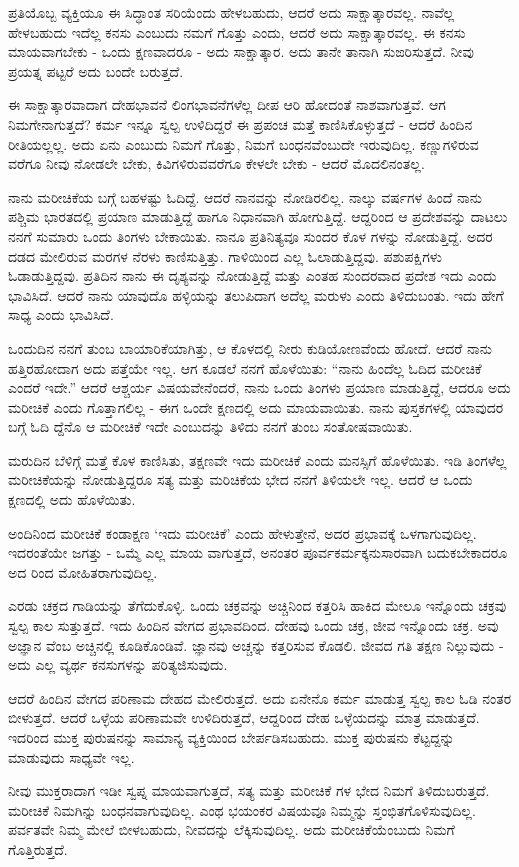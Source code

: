 ಪ್ರತಿಯೊಬ್ಬ ವ್ಯಕ್ತಿಯೂ ಈ ಸಿದ್ಧಾಂತ ಸರಿಯೆಂದು ಹೇಳಬಹುದು, ಆದರೆ ಅದು ಸಾಕ್ಷಾತ್ಕಾರವಲ್ಲ. ನಾವೆಲ್ಲ ಹೇಳಬಹುದು ಇದೆಲ್ಲ ಕನಸು ಎಂಬುದು ನಮಗೆ ಗೊತ್ತು ಎಂದು, ಆದರೆ ಅದು ಸಾಕ್ಷಾತ್ಕಾರವಲ್ಲ. ಈ ಕನಸು ಮಾಯವಾಗಬೇಕು - ಒಂದು ಕ್ಷಣವಾದರೂ - ಅದು ಸಾಕ್ಷಾತ್ಕಾರ. ಅದು ತಾನೇ ತಾನಾಗಿ ಸುಙರಿಸುತ್ತದೆ. ನೀವು ಪ್ರಯತ್ನ ಪಟ್ಟರೆ ಅದು ಬಂದೇ ಬರುತ್ತದೆ.

ಈ ಸಾಕ್ಷಾತ್ಕಾರವಾದಾಗ ದೇಹಭಾವನೆ ಲಿಂಗಭಾವನೆಗಳೆಲ್ಲ ದೀಪ ಆರಿ ಹೋದಂತೆ ನಾಶವಾಗುತ್ತವೆ. ಆಗ ನಿಮಗೇನಾಗುತ್ತದೆ? ಕರ್ಮ ಇನ್ನೂ ಸ್ವಲ್ಪ ಉಳಿದಿದ್ದರೆ ಈ ಪ್ರಪಂಚ ಮತ್ತೆ ಕಾಣಿಸಿಕೊಳ್ಳುತ್ತದೆ - ಆದರೆ ಹಿಂದಿನ ರೀತಿಯಲ್ಲಲ್ಲ. ಅದು ಏನು ಎಂಬುದು ನಿಮಗೆ ಗೊತ್ತು, ನಿಮಗೆ ಬಂಧನವೆಂಬುದೇ ಇರುವುದಿಲ್ಲ. ಕಣ್ಣುಗಳಿರುವ ವರೆಗೂ ನೀವು ನೋಡಲೇ ಬೇಕು, ಕಿವಿಗಳಿರುವವರೆಗೂ ಕೇಳಲೇ ಬೇಕು - ಆದರೆ ಮೊದಲಿನಂತಲ್ಲ.

ನಾನು ಮರೀಚಿಕೆಯ ಬಗ್ಗೆ ಬಹಳಷ್ಟು ಓದಿದ್ದೆ. ಆದರೆ ನಾನವನ್ನು ನೋಡಿರಲಿಲ್ಲ. ನಾಲ್ಕು ವರ್ಷಗಳ ಹಿಂದೆ ನಾನು ಪಶ್ಚಿಮ ಭಾರತದಲ್ಲಿ ಪ್ರಯಾಣ ಮಾಡುತ್ತಿದ್ದೆ ಹಾಗೂ ನಿಧಾನವಾಗಿ ಹೋಗುತ್ತಿದ್ದೆ. ಆದ್ದರಿಂದ ಆ ಪ್ರದೇಶವನ್ನು ದಾಟಲು ನನಗೆ ಸುಮಾರು ಒಂದು ತಿಂಗಳು ಬೇಕಾಯಿತು. ನಾನೂ ಪ್ರತಿನಿತ್ಯವೂ ಸುಂದರ ಕೊಳ ಗಳನ್ನು ನೋಡುತ್ತಿದ್ದೆ. ಅದರ ದಡದ ಮೇಲಿರುವ ಮರಗಳ ನೆರಳು ಕಾಣಿಸುತ್ತಿತ್ತು. ಗಾಳಿಯಿಂದ ಎಲ್ಲ ಓಲಾಡುತ್ತಿದ್ದವು. ಪಶುಪಕ್ಷಿಗಳು ಓಡಾಡುತ್ತಿದ್ದವು. ಪ್ರತಿದಿನ ನಾನು ಈ ದೃಶ್ಯವನ್ನು ನೋಡುತ್ತಿದ್ದೆ ಮತ್ತು ಎಂತಹ ಸುಂದರವಾದ ಪ್ರದೇಶ ಇದು ಎಂದು ಭಾವಿಸಿದೆ. ಆದರೆ ನಾನು ಯಾವುದೊ ಹಳ್ಳಿಯನ್ನು ತಲುಪಿದಾಗ ಅದೆಲ್ಲ ಮರುಳು ಎಂದು ತಿಳಿದುಬಂತು. ಇದು ಹೇಗೆ ಸಾಧ್ಯ ಎಂದು ಭಾವಿಸಿದೆ.

ಒಂದುದಿನ ನನಗೆ ತುಂಬ ಬಾಯಾರಿಕೆಯಾಗಿತ್ತು, ಆ ಕೊಳದಲ್ಲಿ ನೀರು ಕುಡಿಯೋಣವೆಂದು ಹೋದೆ. ಆದರೆ ನಾನು ಹತ್ತಿರಹೋದಾಗ ಅದು ಪತ್ತೆಯೇ ಇಲ್ಲ. ಆಗ ಕೂಡಲೆ ನನಗೆ ಹೊಳೆಯಿತು: “ನಾನು ಹಿಂದೆಲ್ಲ ಓದಿದ ಮರೀಚಿಕೆ ಎಂದರೆ ಇದೇ.” ಆದರೆ ಆಶ್ಚರ್ಯ ವಿಷಯವೇನೆಂದರೆ, ನಾನು ಒಂದು ತಿಂಗಳು ಪ್ರಯಾಣ ಮಾಡುತ್ತಿದ್ದೆ, ಆದರೂ ಅದು ಮರೀಚಿಕೆ ಎಂದು ಗೊತ್ತಾಗಲಿಲ್ಲ - ಈಗ ಒಂದೇ ಕ್ಷಣದಲ್ಲಿ ಅದು ಮಾಯವಾಯಿತು. ನಾನು ಪುಸ್ತಕಗಳಲ್ಲಿ ಯಾವುದರ ಬಗ್ಗೆ ಓದಿ ದ್ದೆನೊ ಆ ಮರೀಚಿಕೆ ಇದೇ ಎಂಬುದನ್ನು ತಿಳಿದು ನನಗೆ ತುಂಬ ಸಂತೋಷವಾಯಿತು.

ಮರುದಿನ ಬೆಳಿಗ್ಗೆ ಮತ್ತೆ ಕೊಳ ಕಾಣಿಸಿತು, ತಕ್ಷಣವೇ ಇದು ಮರೀಚಿಕೆ ಎಂದು ಮನಸ್ಸಿಗೆ ಹೊಳೆಯಿತು. ಇಡಿ ತಿಂಗಳೆಲ್ಲ ಮರೀಚಿಕೆಯನ್ನು ನೋಡುತ್ತಿದ್ದರೂ ಸತ್ಯ ಮತ್ತು ಮರಿಚಿಕೆಯ ಭೇದ ನನಗೆ ತಿಳಿಯಲೇ ಇಲ್ಲ. ಆದರೆ ಆ ಒಂದು ಕ್ಷಣದಲ್ಲಿ ಅದು ಹೊಳೆಯಿತು.

ಅಂದಿನಿಂದ ಮರೀಚಿಕೆ ಕಂಡಾಕ್ಷಣ ‘ಇದು ಮರೀಚಿಕೆ’ ಎಂದು ಹೇಳುತ್ತೇನೆ, ಅದರ ಪ್ರಭಾವಕ್ಕೆ ಒಳಗಾಗುವುದಿಲ್ಲ. ಇದರಂತೆಯೇ ಜಗತ್ತು - ಒಮ್ಮೆ ಎಲ್ಲ ಮಾಯ ವಾಗುತ್ತದೆ, ಅನಂತರ ಪೂರ್ವಕರ್ಮಕ್ಕನುಸಾರವಾಗಿ ಬದುಕಬೇಕಾದರೂ ಅದ ರಿಂದ ಮೋಹಿತರಾಗುವುದಿಲ್ಲ.

ಎರಡು ಚಕ್ರದ ಗಾಡಿಯನ್ನು ತೆಗೆದುಕೊಳ್ಳಿ. ಒಂದು ಚಕ್ರವನ್ನು ಅಚ್ಚಿನಿಂದ ಕತ್ತರಿಸಿ ಹಾಕಿದ ಮೇಲೂ ಇನ್ನೊಂದು ಚಕ್ರವು ಸ್ವಲ್ಪ ಕಾಲ ಸುತ್ತುತ್ತದೆ. ಇದು ಹಿಂದಿನ ವೇಗದ ಪ್ರಭಾವದಿಂದ. ದೇಹವು ಒಂದು ಚಕ್ರ, ಜೀವ ಇನ್ನೊಂದು ಚಕ್ರ. ಅವು ಅಜ್ಞಾನ ವೆಂಬ ಅಚ್ಚಿನಲ್ಲಿ ಕೂಡಿಕೊಂಡಿವೆ. ಜ್ಞಾನವು ಅಚ್ಚನ್ನು ಕತ್ತರಿಸುವ ಕೊಡಲಿ. ಜೀವದ ಗತಿ ತಕ್ಷಣ ನಿಲ್ಲುವುದು - ಅದು ಎಲ್ಲ ವ್ಯರ್ಥ ಕನಸುಗಳನ್ನು ಪರಿತ್ಯಜಿಸುವುದು.

ಆದರೆ ಹಿಂದಿನ ವೇಗದ ಪರಿಣಾಮ ದೇಹದ ಮೇಲಿರುತ್ತದೆ. ಅದು ಏನೇನೊ ಕರ್ಮ ಮಾಡುತ್ತ ಸ್ವಲ್ಪ ಕಾಲ ಓಡಿ ನಂತರ ಬೀಳುತ್ತದೆ. ಆದರೆ ಒಳ್ಳೆಯ ಪರಿಣಾಮವೇ ಉಳಿದಿರುತ್ತದೆ, ಆದ್ದರಿಂದ ದೇಹ ಒಳ್ಳೆಯದನ್ನು ಮಾತ್ರ ಮಾಡುತ್ತದೆ. ಇದರಿಂದ ಮುಕ್ತ ಪುರುಷನನ್ನು ಸಾಮಾನ್ಯ ವ್ಯಕ್ತಿಯಿಂದ ಬೇರ್ಪಡಿಸಬಹುದು. ಮುಕ್ತ ಪುರುಷನು ಕೆಟ್ಟದ್ದನ್ನು ಮಾಡುವುದು ಸಾಧ್ಯವೇ ಇಲ್ಲ.

ನೀವು ಮುಕ್ತರಾದಾಗ ಇಡೀ ಸ್ವಪ್ನ ಮಾಯವಾಗುತ್ತದೆ, ಸತ್ಯ ಮತ್ತು ಮರೀಚಿಕೆ ಗಳ ಭೇದ ನಿಮಗೆ ತಿಳಿದುಬರುತ್ತದೆ. ಮರೀಚಿಕೆ ನಿಮಗಿನ್ನು ಬಂಧನವಾಗುವುದಿಲ್ಲ. ಎಂಥ ಭಯಂಕರ ವಿಷಯವೂ ನಿಮ್ಮನ್ನು ಸ್ತಂಭಿತಗೊಳಿಸುವುದಿಲ್ಲ. ಪರ್ವತವೇ ನಿಮ್ಮ ಮೇಲೆ ಬೀಳಬಹುದು, ನೀವದನ್ನು ಲೆಕ್ಕಿಸುವುದಿಲ್ಲ. ಅದು ಮರೀಚಿಕೆಯೆಂಬುದು ನಿಮಗೆ ಗೊತ್ತಿರುತ್ತದೆ.


